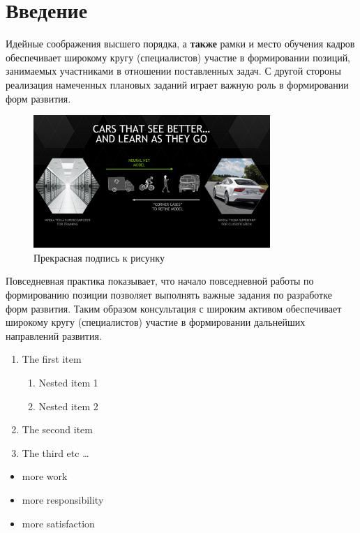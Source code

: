 \documentclass[a4paper,14pt]{extarticle}
\begin{document}

\tableofcontents
\clearpage

\section{Введение}
Идейные соображения высшего порядка, а \textbf{также} рамки и место обучения кадров обеспечивает широкому кругу (специалистов) участие в формировании позиций, занимаемых участниками в отношении поставленных задач. С другой стороны реализация намеченных плановых заданий играет важную роль в формировании форм развития. 

\begin{figure}[h]
    \centering
    \includegraphics[width=0.8\textwidth]{test.png}
    \caption{Прекрасная подпись к рисунку}
\end{figure}

Повседневная практика показывает, что начало повседневной работы по формированию позиции позволяет выполнять важные задания по разработке форм развития. Таким образом консультация с широким активом обеспечивает широкому кругу (специалистов) участие в формировании дальнейших направлений развития.
\begin{enumerate}
\item The first item
    \begin{enumerate}
    \item Nested item 1
    \item Nested item 2
    \end{enumerate}
\item The second item
\item The third etc \ldots
\end{enumerate}

\begin{itemize}
\item more work
\item more responsibility
\item more satisfaction
\end{itemize}
\end{document}
